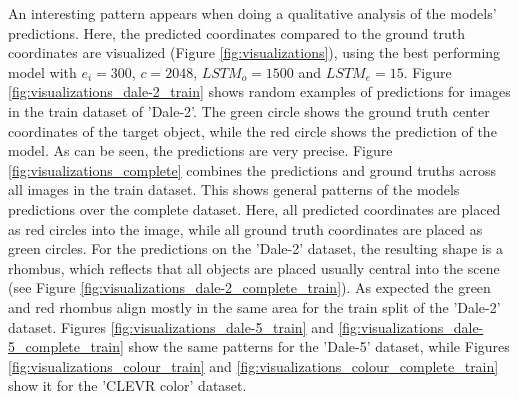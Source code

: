 An interesting pattern appears when doing a qualitative analysis of the models' predictions.
Here, the predicted coordinates compared to the ground truth coordinates are visualized (Figure \ref{fig:visualizations}), using the best performing model with $e_i=300$, $c=2048$, $LSTM_o=1500$ and $LSTM_e=15$.
Figure \ref{fig:visualizations_dale-2_train} shows random examples of predictions for images in the train dataset of 'Dale-2'.
The green circle shows the ground truth center coordinates of the target object, while the red circle shows the prediction of the model.
As can be seen, the predictions are very precise.
Figure \ref{fig:visualizations_complete} combines the predictions and ground truths across all images in the train dataset.
This shows general patterns of the models predictions over the complete dataset.
Here, all predicted coordinates are placed as red circles into the image, while all ground truth coordinates are placed as green circles.
For the predictions on the 'Dale-2' dataset, the resulting shape is a rhombus, which reflects that all objects are placed usually central into the scene (see Figure \ref{fig:visualizations_dale-2_complete_train}).
As expected the green and red rhombus align mostly in the same area for the train split of the 'Dale-2' dataset.
Figures \ref{fig:visualizations_dale-5_train} and \ref{fig:visualizations_dale-5_complete_train} show the same patterns for the 'Dale-5' dataset, while Figures \ref{fig:visualizations_colour_train} and \ref{fig:visualizations_colour_complete_train} show it for the 'CLEVR color' dataset.

